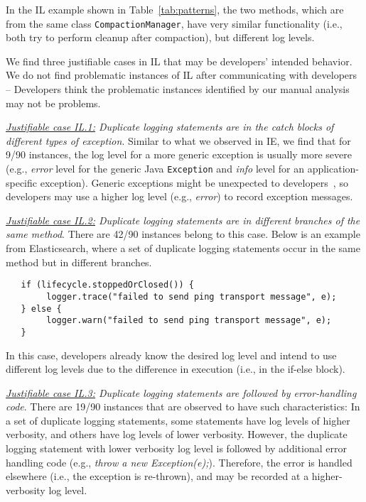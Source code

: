  In the IL example shown in Table~\ref{tab:patterns}, the two methods, which are from the same class {\tt\small CompactionManager}, have very similar functionality (i.e., both try to perform cleanup after compaction), but different log levels. %

 We find three justifiable cases in IL that may be developers' intended behavior. We do not find problematic instances of IL after communicating with developers -- Developers think the problematic instances identified by our manual analysis may not be problems.

{\em \underline{Justifiable case IL.1:} Duplicate logging statements are in the catch blocks of different types of exception}. Similar to what we observed in IE, we find that for 9/90 instances, the log level for a more generic exception is usually more severe (e.g., {\em error} level for the generic Java {\tt\small Exception} and {\em info} level for an application-specific exception). Generic exceptions might be unexpected to developers~\cite{Yuan:2014:STP:2685048.2685068}, so developers may use a higher log level (e.g., {\em error}) to record exception messages.

{\em \underline{Justifiable case IL.2:} Duplicate logging statements are in different branches of the same method}. There are 42/90 instances belong to this case. Below is an example from Elasticsearch, where a set of duplicate logging statements occur in the same method but in different branches.
\begin{lstlisting}
   if (lifecycle.stoppedOrClosed()) {
        logger.trace("failed to send ping transport message", e);
   } else {
        logger.warn("failed to send ping transport message", e);
   }
\end{lstlisting}
In this case, developers already know the desired log level and intend to use different log levels due to the difference in execution (i.e., in the if-else block). %

{\em \underline{Justifiable case IL.3:} Duplicate logging statements are followed by error-handling code}. There are 19/90 instances that are observed to have such characteristics: In a set of duplicate logging statements, some statements have log levels of higher verbosity, and others have log levels of lower verbosity. However, the duplicate logging statement with lower verbosity log level is followed by additional error handling code (e.g., {\em throw a new Exception(e);}). Therefore, the error is handled elsewhere (i.e., the exception is re-thrown), and may be recorded at a higher-verbosity log level.


